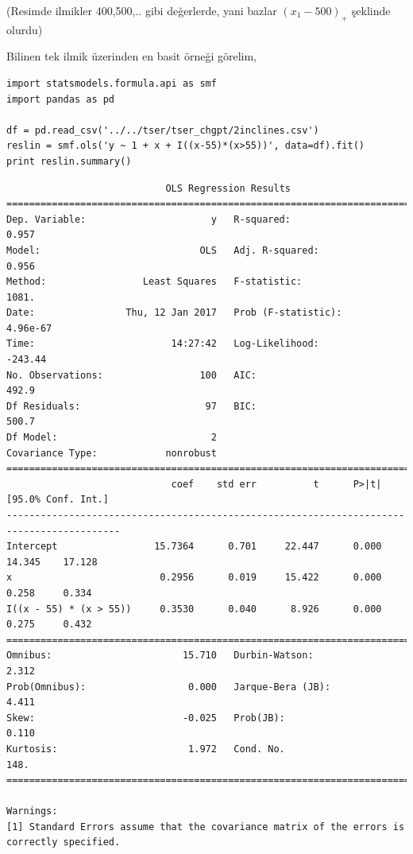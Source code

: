 \documentclass[12pt,fleqn]{article}\usepackage{../../common}
\begin{document}
(Resimde ilmikler 400,500,.. gibi değerlerde, yani bazlar $(x_1-500)_+$
şeklinde olurdu)

Bilinen tek ilmik üzerinden en basit örneği görelim,

\begin{verbatim}
import statsmodels.formula.api as smf
import pandas as pd

df = pd.read_csv('../../tser/tser_chgpt/2inclines.csv')
reslin = smf.ols('y ~ 1 + x + I((x-55)*(x>55))', data=df).fit()
print reslin.summary()
\end{verbatim}

\begin{verbatim}
                            OLS Regression Results                            
==============================================================================
Dep. Variable:                      y   R-squared:                       0.957
Model:                            OLS   Adj. R-squared:                  0.956
Method:                 Least Squares   F-statistic:                     1081.
Date:                Thu, 12 Jan 2017   Prob (F-statistic):           4.96e-67
Time:                        14:27:42   Log-Likelihood:                -243.44
No. Observations:                 100   AIC:                             492.9
Df Residuals:                      97   BIC:                             500.7
Df Model:                           2                                         
Covariance Type:            nonrobust                                         
==========================================================================================
                             coef    std err          t      P>|t|      [95.0% Conf. Int.]
------------------------------------------------------------------------------------------
Intercept                 15.7364      0.701     22.447      0.000        14.345    17.128
x                          0.2956      0.019     15.422      0.000         0.258     0.334
I((x - 55) * (x > 55))     0.3530      0.040      8.926      0.000         0.275     0.432
==============================================================================
Omnibus:                       15.710   Durbin-Watson:                   2.312
Prob(Omnibus):                  0.000   Jarque-Bera (JB):                4.411
Skew:                          -0.025   Prob(JB):                        0.110
Kurtosis:                       1.972   Cond. No.                         148.
==============================================================================

Warnings:
[1] Standard Errors assume that the covariance matrix of the errors is correctly specified.
\end{verbatim}
\end{document}
